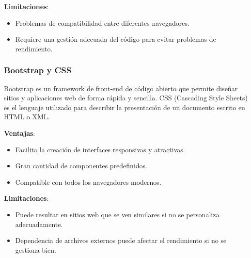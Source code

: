 \textbf{Limitaciones}:
\begin{itemize}
  \item Problemas de compatibilidad entre diferentes navegadores.
  \item Requiere una gestión adecuada del código para evitar problemas de rendimiento.
\end{itemize}

\subsubsection{Bootstrap y CSS}

Bootstrap es un framework de front-end de código abierto que permite diseñar sitios y aplicaciones web de forma rápida y sencilla. CSS (Cascading Style Sheets) es el lenguaje utilizado para describir la presentación de un documento escrito en HTML o XML.

\textbf{Ventajas}:
\begin{itemize}
  \item Facilita la creación de interfaces responsivas y atractivas.
  \item Gran cantidad de componentes predefinidos.
  \item Compatible con todos los navegadores modernos.
\end{itemize}

\textbf{Limitaciones}:
\begin{itemize}
  \item Puede resultar en sitios web que se ven similares si no se personaliza adecuadamente.
  \item Dependencia de archivos externos puede afectar el rendimiento si no se gestiona bien.
\end{itemize}